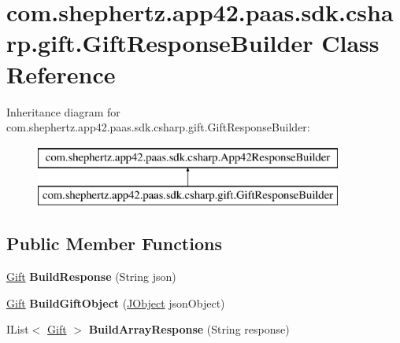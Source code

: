 \hypertarget{classcom_1_1shephertz_1_1app42_1_1paas_1_1sdk_1_1csharp_1_1gift_1_1_gift_response_builder}{\section{com.\+shephertz.\+app42.\+paas.\+sdk.\+csharp.\+gift.\+Gift\+Response\+Builder Class Reference}
\label{classcom_1_1shephertz_1_1app42_1_1paas_1_1sdk_1_1csharp_1_1gift_1_1_gift_response_builder}
}
Inheritance diagram for com.\+shephertz.\+app42.\+paas.\+sdk.\+csharp.\+gift.\+Gift\+Response\+Builder\+:\begin{figure}[H]
\begin{center}
\leavevmode
\includegraphics[height=2.000000cm]{classcom_1_1shephertz_1_1app42_1_1paas_1_1sdk_1_1csharp_1_1gift_1_1_gift_response_builder}
\end{center}
\end{figure}
\subsection*{Public Member Functions}
\begin{DoxyCompactItemize}
\item 
\hypertarget{classcom_1_1shephertz_1_1app42_1_1paas_1_1sdk_1_1csharp_1_1gift_1_1_gift_response_builder_a93af0220df17de0ba356c95b91e9ced1}{\hyperlink{classcom_1_1shephertz_1_1app42_1_1paas_1_1sdk_1_1csharp_1_1gift_1_1_gift}{Gift} {\bfseries Build\+Response} (String json)}\label{classcom_1_1shephertz_1_1app42_1_1paas_1_1sdk_1_1csharp_1_1gift_1_1_gift_response_builder_a93af0220df17de0ba356c95b91e9ced1}

\item 
\hypertarget{classcom_1_1shephertz_1_1app42_1_1paas_1_1sdk_1_1csharp_1_1gift_1_1_gift_response_builder_add289cf3ec837b40de5d634379173eff}{\hyperlink{classcom_1_1shephertz_1_1app42_1_1paas_1_1sdk_1_1csharp_1_1gift_1_1_gift}{Gift} {\bfseries Build\+Gift\+Object} (\hyperlink{class_simple_j_s_o_n_1_1_j_object}{J\+Object} json\+Object)}\label{classcom_1_1shephertz_1_1app42_1_1paas_1_1sdk_1_1csharp_1_1gift_1_1_gift_response_builder_add289cf3ec837b40de5d634379173eff}

\item 
\hypertarget{classcom_1_1shephertz_1_1app42_1_1paas_1_1sdk_1_1csharp_1_1gift_1_1_gift_response_builder_afb64101dd18f3ed36f53e5f507d23d64}{I\+List$<$ \hyperlink{classcom_1_1shephertz_1_1app42_1_1paas_1_1sdk_1_1csharp_1_1gift_1_1_gift}{Gift} $>$ {\bfseries Build\+Array\+Response} (String response)}\label{classcom_1_1shephertz_1_1app42_1_1paas_1_1sdk_1_1csharp_1_1gift_1_1_gift_response_builder_afb64101dd18f3ed36f53e5f507d23d64}

\end{DoxyCompactItemize}
